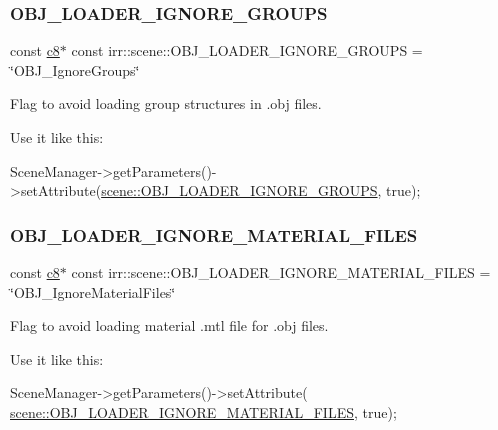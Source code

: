 \subsubsection{\texorpdfstring{O\+B\+J\+\_\+\+L\+O\+A\+D\+E\+R\+\_\+\+I\+G\+N\+O\+R\+E\+\_\+\+G\+R\+O\+U\+PS}{OBJ\_LOADER\_IGNORE\_GROUPS}}
{\footnotesize\ttfamily const \hyperlink{namespaceirr_a9395eaea339bcb546b319e9c96bf7410}{c8}$\ast$ const irr\+::scene\+::\+O\+B\+J\+\_\+\+L\+O\+A\+D\+E\+R\+\_\+\+I\+G\+N\+O\+R\+E\+\_\+\+G\+R\+O\+U\+PS = \char`\"{}O\+B\+J\+\_\+\+Ignore\+Groups\char`\"{}}



Flag to avoid loading group structures in .obj files. 

Use it like this\+: 
\begin{DoxyCode}
SceneManager->getParameters()->setAttribute(\hyperlink{namespaceirr_1_1scene_afb0c389302c1e7ad39f83d558dbb2699}{scene::OBJ\_LOADER\_IGNORE\_GROUPS},
       \textcolor{keyword}{true});
\end{DoxyCode}
 \mbox{\label{namespaceirr_1_1scene_ac7d5a31e2146062ddbde288115bb6c7b}} 
\subsubsection{\texorpdfstring{O\+B\+J\+\_\+\+L\+O\+A\+D\+E\+R\+\_\+\+I\+G\+N\+O\+R\+E\+\_\+\+M\+A\+T\+E\+R\+I\+A\+L\+\_\+\+F\+I\+L\+ES}{OBJ\_LOADER\_IGNORE\_MATERIAL\_FILES}}
{\footnotesize\ttfamily const \hyperlink{namespaceirr_a9395eaea339bcb546b319e9c96bf7410}{c8}$\ast$ const irr\+::scene\+::\+O\+B\+J\+\_\+\+L\+O\+A\+D\+E\+R\+\_\+\+I\+G\+N\+O\+R\+E\+\_\+\+M\+A\+T\+E\+R\+I\+A\+L\+\_\+\+F\+I\+L\+ES = \char`\"{}O\+B\+J\+\_\+\+Ignore\+Material\+Files\char`\"{}}



Flag to avoid loading material .mtl file for .obj files. 

Use it like this\+: 
\begin{DoxyCode}
SceneManager->getParameters()->setAttribute(
      \hyperlink{namespaceirr_1_1scene_ac7d5a31e2146062ddbde288115bb6c7b}{scene::OBJ\_LOADER\_IGNORE\_MATERIAL\_FILES}, \textcolor{keyword}{true});
\end{DoxyCode}
 \mbox{\label{namespaceirr_1_1scene_a12d0b16f969fdaaf7c2161a0c7152b54}} 
